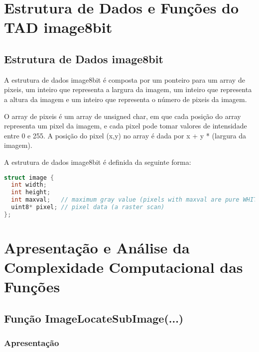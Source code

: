 \documentclass{report}
\begin{document}
\chapter{Estrutura de Dados e Funções do TAD image8bit}

\section{Estrutura de Dados image8bit}

A estrutura de dados image8bit é composta por um ponteiro para um array de pixeis, um inteiro que representa a largura da imagem, um inteiro que representa a altura da imagem e um inteiro que representa o número de pixeis da imagem.
\par
O array de pixeis é um array de unsigned char, em que cada posição do array representa um pixel da imagem, e cada pixel pode tomar valores de intensidade entre 0 e 255. A posição do pixel (x,y) no array é dada por x + y * (largura da imagem).
\par
A estrutura de dados image8bit é definida da seguinte forma:

\begin{lstlisting}[language=C]
struct image {
  int width;
  int height;
  int maxval;   // maximum gray value (pixels with maxval are pure WHITE)
  uint8* pixel; // pixel data (a raster scan)
};
\end{lstlisting}




\chapter{Apresentação e Análise da Complexidade Computacional das Funções}

\section{Função ImageLocateSubImage(...)}
\subsection{Apresentação}
\end{document}
